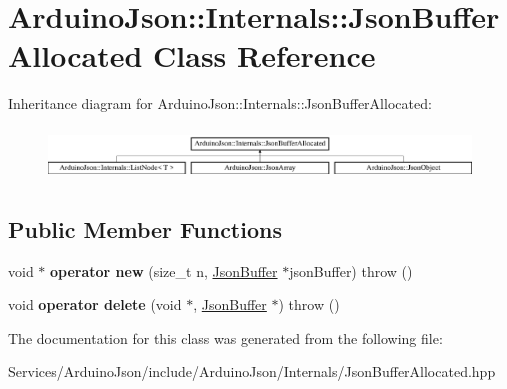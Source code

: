 \hypertarget{class_arduino_json_1_1_internals_1_1_json_buffer_allocated}{}\section{Arduino\+Json\+:\+:Internals\+:\+:Json\+Buffer\+Allocated Class Reference}
\label{class_arduino_json_1_1_internals_1_1_json_buffer_allocated}
Inheritance diagram for Arduino\+Json\+:\+:Internals\+:\+:Json\+Buffer\+Allocated\+:\begin{figure}[H]
\begin{center}
\leavevmode
\includegraphics[height=1.398252cm]{class_arduino_json_1_1_internals_1_1_json_buffer_allocated}
\end{center}
\end{figure}
\subsection*{Public Member Functions}
\begin{DoxyCompactItemize}
\item 
\hypertarget{class_arduino_json_1_1_internals_1_1_json_buffer_allocated_afbcc0189d85cc4969991b6dc41276fb1}{}void $\ast$ {\bfseries operator new} (size\+\_\+t n, \hyperlink{class_arduino_json_1_1_json_buffer}{Json\+Buffer} $\ast$json\+Buffer)  throw ()\label{class_arduino_json_1_1_internals_1_1_json_buffer_allocated_afbcc0189d85cc4969991b6dc41276fb1}

\item 
\hypertarget{class_arduino_json_1_1_internals_1_1_json_buffer_allocated_ab1ac3cddbf84578fd87c339cb3967f25}{}void {\bfseries operator delete} (void $\ast$, \hyperlink{class_arduino_json_1_1_json_buffer}{Json\+Buffer} $\ast$)  throw ()\label{class_arduino_json_1_1_internals_1_1_json_buffer_allocated_ab1ac3cddbf84578fd87c339cb3967f25}

\end{DoxyCompactItemize}


The documentation for this class was generated from the following file\+:\begin{DoxyCompactItemize}
\item 
Services/\+Arduino\+Json/include/\+Arduino\+Json/\+Internals/Json\+Buffer\+Allocated.\+hpp\end{DoxyCompactItemize}
